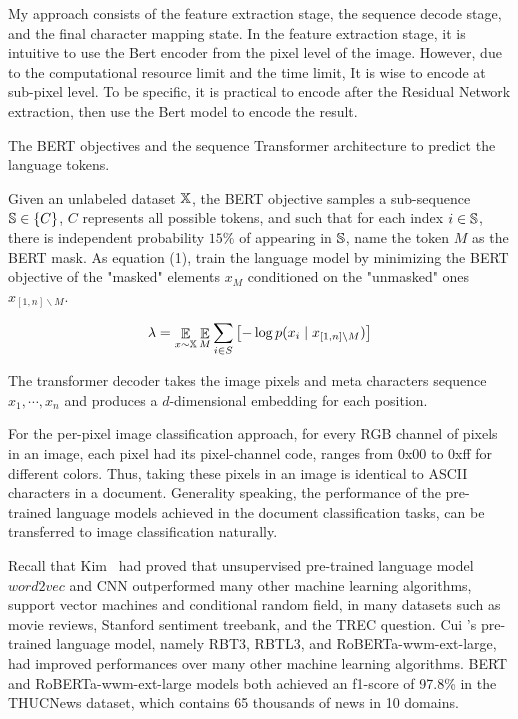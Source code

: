 \documentclass[10pt,twocolumn,letterpaper]{article}
\begin{document}
My approach consists of the feature extraction stage, the sequence decode stage, and the final character mapping state.
In the feature extraction stage, it is intuitive to use the Bert encoder from the pixel level of the image.
However, due to the computational resource limit and the time limit,
It is wise to encode at sub-pixel level.
To be specific, it is practical to encode after the Residual Network extraction, then use the Bert model to encode the result.

The BERT objectives and the sequence Transformer architecture to predict the language tokens.

\par Given an unlabeled dataset $\Bbb X$, the BERT objective samples a sub-sequence $\Bbb S \in \{C\}$,
$C$ represents all possible tokens, and such that for each index $i \in \Bbb S$,
there is independent probability $15\%$ of appearing in $\Bbb S$,
name the token $M$ as the BERT mask.
As equation (1), train the language model by minimizing the BERT objective of the "masked" elements $x_M$
conditioned on the "unmasked" ones $x_{\left[1,n\right]\backslash M}$.

\begin{equation}
  \lambda = \mathop{\Bbb E}\limits_{x\sim\Bbb X} \mathop{\Bbb E}\limits_{M} \sum_{i\in S}{\bigl[-\log{p(x_i\mid x_{\left[1,n \right]\backslash M})\bigr]}}
\end{equation}

\par The transformer decoder takes the image pixels and meta characters sequence $x_1,\cdots,x_n$ and produces a $d$-dimensional
embedding for each position.

For the per-pixel image classification approach, for every RGB channel of pixels in an image,
each pixel had its pixel-channel code, ranges from 0x00 to 0xff for different colors.
Thus, taking these pixels in an image is identical to ASCII characters in a document.
Generality speaking, the performance of the pre-trained language models achieved in the document classification tasks, can be transferred to image classification naturally.

\par Recall that Kim~\cite{kim2014convolutional} had proved that unsupervised pre-trained language model $word2vec$ and CNN outperformed many other machine learning algorithms,
\eg support vector machines and conditional random field, in many datasets such as movie reviews, Stanford sentiment treebank, and the TREC question.
Cui \etal's pre-trained language model, namely RBT3, RBTL3, and RoBERTa-wwm-ext-large, had improved performances over many other machine learning algorithms.
BERT and RoBERTa-wwm-ext-large models both achieved an f1-score of 97.8\% in the THUCNews dataset, which contains 65 thousands of news in 10 domains.
\end{document}
